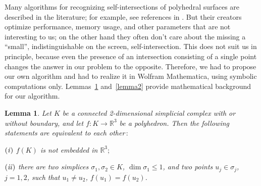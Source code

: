 \documentclass[12pt, reqno]{amsart}
\newtheorem{lemma}{Lemma}
\begin{document}
Many algorithms for recognizing self-intersections of polyhedral surfaces 
are described in the literature; for example, see references in \cite{AV24}.
But their creators optimize performance, memory usage, and other parameters 
that are not interesting to us; on the other hand  they often don't care about 
the missing a ``small'', indistinguishable on the screen, self-intersection.
This does not suit us in principle, because even the presence of an intersection
consisting of a single point changes the answer in our problem to the opposite.
Therefore, we had to propose our own algorithm and had to realize it in Wolfram
Mathematica, using symbolic computations only.
Lemmas~\ref{lemma1} and~\ref{lemma2} provide mathematical background for our algorithm.

\begin{lemma}\label{lemma1}
Let 
$K$ 
be a connected 2-dimensional simplicial complex with or without boundary, and let 
$f: K\to\mathbb{R}^3$ 
be a polyhedron.
Then the following statements are equivalent to each other\,$:$ 
\par
$(\mbox{\emph{i}})$ $f(K)$
is not embedded in 
$\mathbb{R}^3;$
\par
$(\mbox{\emph{ii}})$ there are two simplices 
$\sigma_1, \sigma_2\in K$, $\dim\sigma_1\leqslant 1$,
and two points 
$u_j\in\sigma_j$, $j=1,2$,
such that 
$u_1\neq u_2$, $f(u_1)=f(u_2)$.
\end{lemma}
\end{document}
